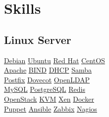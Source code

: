\documentclass[]{willianpaixao-resume}
\begin{document}
\begin{minipage}[t]{0.35\textwidth}

\section{Skills}
\subsection{Linux Server}
\href{http://www.debian.org/}{Debian}\textbullet
\href{http://www.ubuntu.com/}{Ubuntu}\textbullet
\href{http://www.redhat.com/}{Red Hat}\textbullet
\href{http://www.centos.org/}{CentOS} \\
\href{http://httpd.apache.org/}{Apache}\textbullet
\href{https://www.isc.org/downloads/bind/}{BIND}\textbullet
\href{https://www.isc.org/downloads/dhcp/}{DHCP}\textbullet
\href{https://www.samba.org/}{Samba} \\
\href{http://www.postfix.org/}{Postfix} \textbullet{}
\href{http://www.dovecot.org/}{Dovecot} \textbullet{}
\href{http://www.openldap.org/}{OpenLDAP} \\
\href{https://www.mysql.com/}{MySQL} \textbullet{}
\href{http://www.postgresql.org/}{PostgreSQL} \textbullet{}
\href{http://redis.io/}{Redis} \\
\href{http://openstack.org/}{OpenStack} \textbullet{}
\href{http://www.linux-kvm.org/}{KVM} \textbullet{}
\href{http://xenproject.org/}{Xen} \textbullet{}
\href{http://www.docker.com/}{Docker} \\
\href{http://puppetlabs.com/}{Puppet} \textbullet{}
\href{https://www.ansible.com/}{Ansible} \textbullet{}
\href{http://www.zabbix.com/}{Zabbix} \textbullet{}
\href{http://www.nagios.com/}{Nagios} \\
\sectionsep


\end{minipage}
\end{document}
